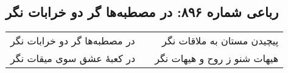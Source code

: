 \begin{center}
\section*{رباعی شماره ۸۹۶: در مصطبه‌ها گر دو خرابات نگر}
\label{sec:0896}
\begin{longtable}{l p{0.5cm} r}
در مصطبه‌ها گر دو خرابات نگر
&&
پیچیدن مستان به ملاقات نگر
\\
در کعبهٔ عشق سوی میقات نگر
&&
هیهات شنو ز روح و هیهات نگر
\\
\end{longtable}
\end{center}
